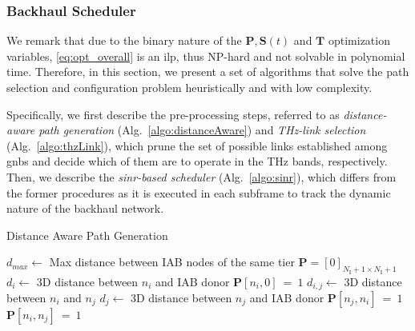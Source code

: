 \subsubsection{Backhaul Scheduler}
\label{sub:BackSche}

We remark that due to the binary nature of the $\bm{P}, \bm{S}(t)$ and $\bm{T}$ optimization variables, \eqref{eq:opt_overall} is an \gls{ilp}, thus NP-hard and not solvable in polynomial time. Therefore, in this section, we present a set of algorithms that solve the path selection and configuration problem heuristically and with low complexity. 

Specifically, we first describe the pre-processing steps, referred to as \textit{distance-aware path generation} (Alg.~\ref{algo:distanceAware}) and \textit{THz-link selection} (Alg.~\ref{algo:thzLink}), which prune the set of possible links established among \glspl{gnb} and decide which of them are to operate in the THz bands, respectively. Then, we describe the \textit{\gls{sinr}-based scheduler} (Alg.~\ref{algo:sinr}), which differs from the former procedures as it is executed in each subframe to track the dynamic nature of the backhaul network.

\begin{algorithm}[b]
\small
	\caption{Distance Aware Path Generation} 
	\begin{algorithmic}
    \State $d_{max} \gets$ Max distance between IAB nodes of the same tier
	\State $\bm{P} = [0]_{N_{\mathrm{I}} + 1 \times N_{\mathrm{I}} + 1}$
                \State $d_i \gets $ 3D distance between $n_i$ and IAB donor
                		\State $ \bm{P} [n_i, 0]~=~1$
                \EndIf
				\State $d_{i, j} \gets$ 3D distance between $n_i$ and $n_j$ 
    				\State $d_j \gets$ 3D distance between $n_j$ and IAB donor
        				\State $ \bm{P} [n_j, n_i]~=~1$
    				\Else 
    				    \State $ \bm{P} [n_i, n_j]~=~1$
				    \EndIf
				\EndIf
			\EndFor
		\EndFor
	\end{algorithmic} 
\label{algo:distanceAware}
\end{algorithm}

